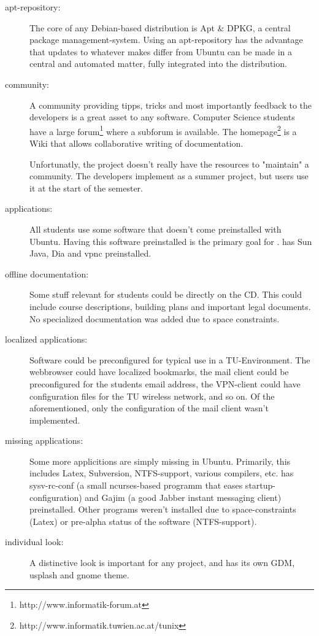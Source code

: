 \begin{description}
  \item[apt-repository:] The core of any Debian-based distribution is Apt \& DPKG,
    a central package management-system. Using an apt-repository has the
    advantage that updates to whatever makes \tunix differ from Ubuntu can be
    made in a central and automated matter, fully integrated into the
    distribution.
  \item[community:] A community providing tipps, tricks and most importantly
    feedback to the developers is a great asset to any software. Computer
    Science students have a large forum\footnote{http://www.informatik-forum.at}
    where a \tunix subforum is available. The \tunix
    homepage\footnote{http://www.informatik.tuwien.ac.at/tunix} is a Wiki that
    allows collaborative writing of documentation. 

    Unfortunatly, the \tunix project doesn't really have the resources to
    "maintain" a community. The developers implement \tunix as a summer project,
    but users use it at the start of the semester. 
  \item[applications:] All students use some software that doesn't come
    preinstalled with Ubuntu. Having this software preinstalled is the
    primary goal for \tunix. \tunix has Sun Java, Dia and vpnc
    preinstalled.
  \item[offline documentation:] Some stuff relevant for students could be
    directly on the CD. This could include course descriptions, building
    plans and important legal
    documents. No specialized documentation was added due to space
    constraints.
  \item[localized applications:] Software could be preconfigured for typical
    use in a TU-Environment. The webbrowser could have localized bookmarks,
    the mail client could be preconfigured for the students email address,
    the VPN-client could have configuration files for the TU wireless
    network, and so on. Of the aforementioned, only the configuration of
    the mail client wasn't implemented.
  \item[missing applications:] Some more applicitions are simply missing in
    Ubuntu. Primarily, this includes Latex, Subversion, NTFS-support,
    various compilers, etc. \tunix has sysv-rc-conf (a small ncurses-based
    programm that eases startup-configuration) and Gajim (a good Jabber
    instant messaging client) preinstalled. Other programs weren't
    installed due to space-constraints (Latex) or pre-alpha status of the
    software (NTFS-support).
  \item[individual look:] A distinctive look is important for any project,
    and \tunix has its own GDM, usplash and gnome theme.
\end{description}
